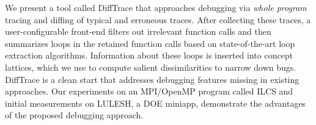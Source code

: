 We present a tool called
DiffTrace that approaches debugging via {\em whole program} tracing and
diffing of typical and erroneous traces.
%
After collecting these traces,
a user-configurable front-end filters out irrelevant function calls
and then summarizes loops in the retained function
calls based on state-of-the-art loop extraction algorithms.
%
Information about these loops is inserted 
into concept lattices, which we use to
compute salient dissimilarities to narrow down bugs.
%
DiffTrace is a clean start that addresses
debugging features missing in existing approaches.
%
Our experiments on an MPI/OpenMP program called
ILCS and initial measurements on LULESH, a DOE miniapp,
demonstrate the advantages of the proposed debugging approach.







